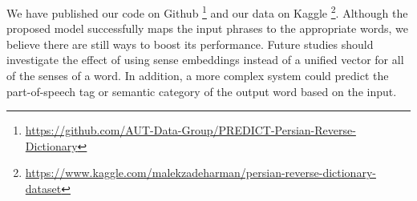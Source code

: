 \documentclass{article}
\begin{document}
We have published our code on Github \footnote{\href{https://github.com/AUT-Data-Group/PREDICT-Persian-Reverse-Dictionary}{https://github.com/AUT-Data-Group/PREDICT-Persian-Reverse-Dictionary}} and our data on Kaggle \footnote{\href{https://www.kaggle.com/malekzadeharman/persian-reverse-dictionary-dataset}{https://www.kaggle.com/malekzadeharman/persian-reverse-dictionary-dataset}}. Although the proposed model successfully maps the input phrases to the appropriate words, we believe there are still ways to boost its performance. Future studies should investigate the effect of using sense embeddings instead of a unified vector for all of the senses of a word. In addition, a more complex system could predict the part-of-speech tag or semantic category of the output word based on the input.


\begin{table}[p]
	\centering
	\caption{The accuracy, synonym accuracy, and cosine loss of the models on the seen and unseen data based on the number of recognized output words}
\end{table}
\end{document}
